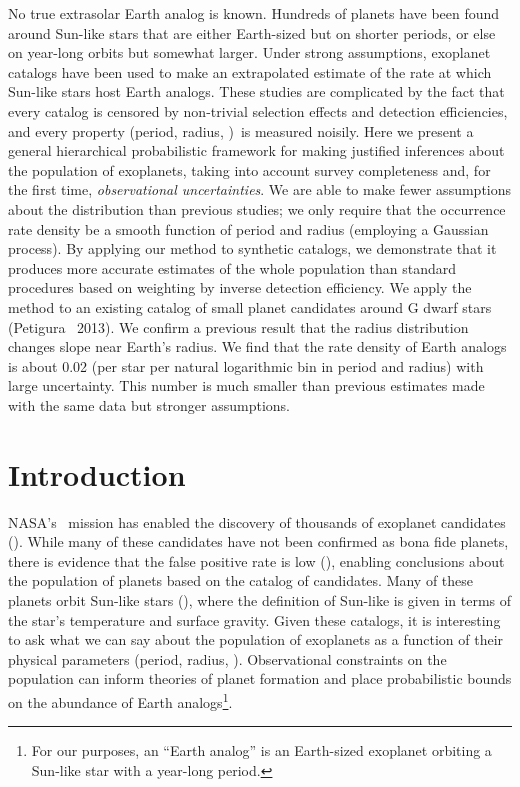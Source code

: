 No true extrasolar Earth analog is known.
Hundreds of planets have been found around Sun-like stars that are either
Earth-sized but on shorter periods, or else on year-long orbits but somewhat
larger.
Under strong assumptions, exoplanet catalogs have been used to make an
extrapolated estimate of the rate at which Sun-like stars host Earth analogs.
These studies are complicated by the fact that every catalog is censored by
non-trivial selection effects and detection efficiencies, and every property
(period, radius, \etc)\ is measured noisily.
Here we present a general hierarchical probabilistic framework for making
justified inferences about the population of exoplanets, taking into account
survey completeness and, for the first time, \emph{observational
uncertainties}.
We are able to make fewer assumptions about the distribution than previous
studies; we only require that the occurrence rate density be a smooth function
of period and radius (employing a Gaussian process).
By applying our method to synthetic catalogs, we demonstrate that it produces
more accurate estimates of the whole population than standard procedures based
on weighting by inverse detection efficiency.
We apply the method to an existing catalog of small planet candidates around G
dwarf stars (Petigura \etal\ 2013).
We confirm a previous result that the radius distribution changes slope near
Earth's radius.
We find that the rate density of Earth analogs is about 0.02 (per star per
natural logarithmic bin in period and radius) with large uncertainty.
This number is much smaller than previous estimates made with the same data
but stronger assumptions.

\section{Introduction}

NASA's \kepler\ mission has enabled the discovery of thousands of exoplanet
candidates (\citealt{Batalha:2013, Burke:2014}).
While many of these candidates have not been confirmed as bona fide planets,
there is evidence that the false positive rate is low (\citealt{Morton:2012,
Fressin:2013}), enabling conclusions about the population of planets based on
the catalog of candidates.
Many of these planets orbit Sun-like stars (\citealt{Petigura:2013}), where the
definition of Sun-like is given in terms of the star's temperature and surface
gravity.
Given these catalogs, it is interesting to ask what we can say about the
population of exoplanets as a function of their physical parameters
(period, radius, \etc).
Observational constraints on the population can inform theories of planet
formation and place probabilistic bounds on the abundance of Earth
analogs\footnote{For our purposes, an ``Earth analog'' is an Earth-sized
exoplanet orbiting a Sun-like star with a year-long period.}.

